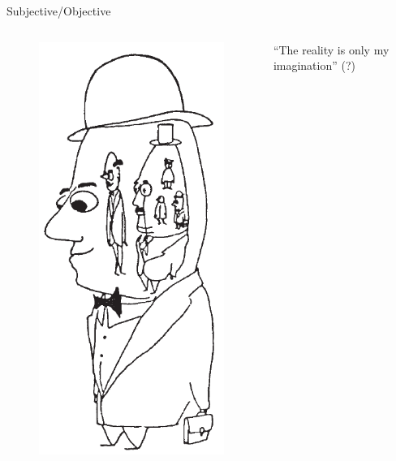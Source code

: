 \documentclass[
	11pt,
	aspectratio=169,
]{beamer}
\begin{document}
\begin{frame}{Subjective/Objective}
\begin{columns}
\begin{figure}
                				\includegraphics[height=0.5\textheight]{resources/man.png}
                			\end{figure}
                			``The reality is only my imagination'' (?)
                    \end{columns}
                \end{frame}
\end{document}
